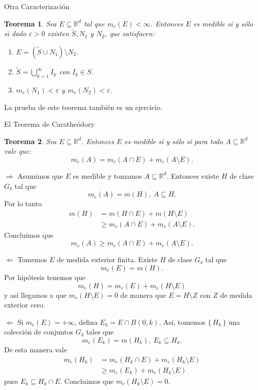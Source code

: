 \documentclass[utf8]{beamer}
\theoremstyle{plain}
\newtheorem{Th}{Teorema}               %
\theoremstyle{definition}
\theoremstyle{remark}
\numberwithin{equation}{section}
\newcommand{\dl}{\delta}                %
\newcommand{\eps}{\varepsilon}          %
\newcommand{\bR}{\mathbb{R}}    %
\newcommand{\set}[1]{\{\,#1\,\}}    %
\renewcommand{\geq}{\geqslant}          %
\newcommand{\less}{\setminus}           %
\newcommand{\To}{\Rightarrow}
\newcommand{\suck}{_{k=1}^\infty} %
\renewcommand{\.}{\Cdot}                %
\begin{document}
\begin{frame}{Otra Caracterización}
  \begin{Th}\label{th:carac2Medib}
    Sea $E\subseteq\bR^d$ tal que $m_e(E)<\infty$. Entonces $E$ es medible si y s\'olo si dado $\eps>0$ existen $\tilde{S}, N_1$ y $N_2$, que satisfacen:
    \begin{enumerate}
      \item $E=(\tilde{S}\cup N_1)\less N_2$.
      \item $\tilde{S}=\bigcup\suck I_k$ con $I_k\in S$.
      \item $m_e(N_1)<\eps$ y $m_e(N_2)<\eps$.
    \end{enumerate}
  \end{Th}
  La prueba de este teorema tambi\'en es un \alert{ejercicio}.
\end{frame}

\begin{frame}{El Teorema de Carathe\'odory}
  \begin{Th}\label{th:Caratheodory}
    Sea $E\subseteq\bR^d$. Entonces $E$ es medible si y s\'olo si para todo $A\subseteq\bR^d$ vale que:
  $$m_e(A)=m_e(A\cap E)+m_e(A\less E).$$
  \end{Th}
  
\end{frame}

\begin{frame}{$\To$}
  Asumimos que $E$ es medible y tomamos $A\subseteq\bR^d$. Entonces existe $H$ de clase $G_\dl$ tal que 
  $$m_e(A)=m(H),\ A\subseteq H.$$
  Por lo tanto 
  \begin{align*}
    m(H)&=m(H\cap E)+m(H\less E)\\
    &\geq m_e(A\cap E)+m_e(A\less E).
  \end{align*}
  Concluimos que 
  $$m_e(A)\geq m_e(A\cap E)+m_e(A\less E).$$
\end{frame}

\begin{frame}{$\Leftarrow$}
  Tomemos $E$ de medida exterior finita. Existe $H$ de clase $G_\dl$ tal que 
  $$m_e(E)=m(H).$$
  Por hip\'otesis tenemos que 
  $$m_e(H)=m_e(E)+m_e(H\less E)$$
  y as\'i llegamos a que $m_e(H\less E)=0$ de manera que $E=H\less Z$ con $Z$ de medida exterior cero.
\end{frame}

\begin{frame}{$\Leftarrow$}
  Si $m_e(E)=+\infty$, defina $E_k=E\cap B(0,k)$. As\'i, tomemos $\set{H_k}$ una colecci\'on de conjuntos $G_\dl$ tales que 
  $$m_e(E_k)=m(H_k),\ E_k\subseteq H_k.$$ 
  De esta manera vale
  \begin{align*}
    m_e(H_k)&=m_e(H_k\cap E)+m_e(H_k\less E)\\
    &\geq m_e(E_k)+m_e(H_k\less E)
  \end{align*}
  pues $E_k\subseteq H_k\cap E$. Concluimos que $m_e(H_k\less E)=0$.
  \end{frame}
\end{document}

